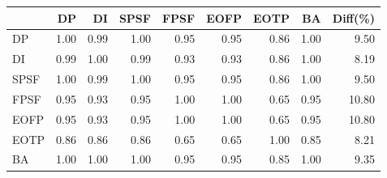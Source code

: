 \begin{tabular}{l|rrrrrrr|r}
\toprule
 & DP & DI & SPSF & FPSF & EOFP & EOTP & BA & Diff(\%)  \\
\midrule
DP & 1.00 & 0.99 & 1.00 & 0.95 & 0.95 & 0.86 & 1.00 & 9.50  \\
DI & 0.99 & 1.00 & 0.99 & 0.93 & 0.93 & 0.86 & 1.00 & 8.19  \\
SPSF & 1.00 & 0.99 & 1.00 & 0.95 & 0.95 & 0.86 & 1.00 & 9.50  \\
FPSF & 0.95 & 0.93 & 0.95 & 1.00 & 1.00 & 0.65 & 0.95 & 10.80  \\
EOFP & 0.95 & 0.93 & 0.95 & 1.00 & 1.00 & 0.65 & 0.95 & 10.80  \\
EOTP & 0.86 & 0.86 & 0.86 & 0.65 & 0.65 & 1.00 & 0.85 & 8.21  \\
BA & 1.00 & 1.00 & 1.00 & 0.95 & 0.95 & 0.85 & 1.00 & 9.35  \\
\bottomrule
\end{tabular}

